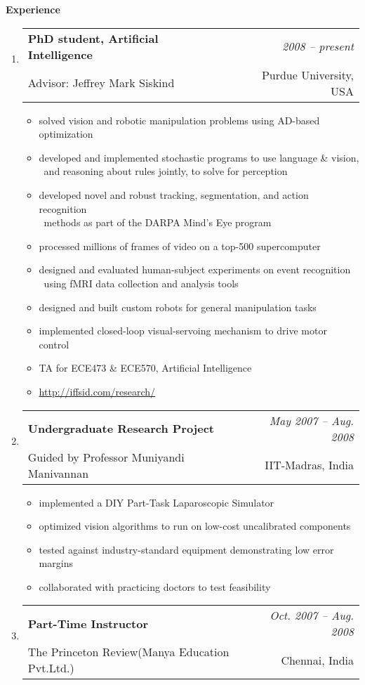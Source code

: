 \documentclass[10pt]{article}
\makeatletter
\newenvironment{position}[4]
{%
\item
  \begin{tabular*}{6.5in}{l@{\extracolsep{\fill}}r}
    \textbf{#1} & \textit{#2} \\ #3 & \small{#4} \\
  \end{tabular*}
  \begin{itemize} \setlength{\parskip}{-1pt}}
  { \end{itemize} }
\newenvironment{region}[2]{%
  \vspace*{0.5ex}
  {\large \textbf{#1}}
  \begin{enumerate}[\color{RoyalBlue}#2]}
  {\end{enumerate}}
\makeatother
\begin{document}
\begin{region} {Experience}{}
  \begin{position} {PhD student, Artificial Intelligence}
    {2008 -- present}
    {Advisor: Jeffrey Mark Siskind}
    {Purdue University, USA}
  \item solved vision and robotic manipulation problems using AD-based optimization
  \item developed and implemented stochastic programs to use language \& vision,\\
    \  and reasoning about rules jointly, to solve for perception
  \item developed novel and robust tracking, segmentation, and action recognition\\
    \  methods as part of the DARPA Mind's Eye program
  \item processed millions of frames of video on a top-500 supercomputer
  \item designed and evaluated human-subject experiments on event recognition\\
    \  using fMRI data collection and analysis tools
  \item designed and built custom robots for general manipulation tasks
  \item implemented closed-loop visual-servoing mechanism to drive motor control
  \item TA for ECE473 \& ECE570, Artificial Intelligence
  \item \url{http://iffsid.com/research/}
  \end{position}
  \begin{position} {Undergraduate Research Project}
    {May 2007 -- Aug. 2008}
    {Guided by Professor Muniyandi Manivannan}
    {IIT-Madras, India}
    \vspace{-0.05in}
  \item implemented a DIY Part-Task Laparoscopic Simulator
  \item optimized vision algorithms to run on low-cost uncalibrated components
  \item tested against industry-standard equipment demonstrating low error margins
  \item collaborated with practicing doctors to test feasibility
  \end{position}
  \begin{position} {Part-Time Instructor}
    {Oct. 2007 -- Aug. 2008}
    {The Princeton Review(Manya Education Pvt.Ltd.)}
    {Chennai, India}
    \vspace{-0.05in}

\end{position}
\end{region}
\end{document}

